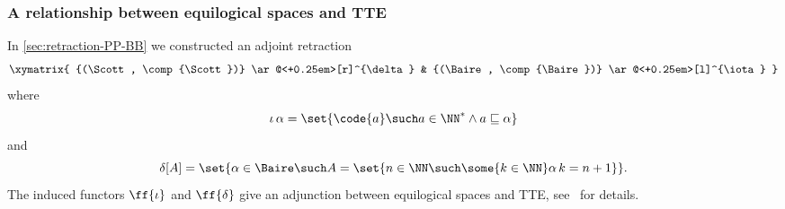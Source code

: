 \subsubsection{A relationship between equilogical spaces and TTE}
\label{sec:equ-tte}

In \cref{sec:retraction-PP-BB} we constructed an adjoint retraction
%
\begin{equation*}
  \xymatrix{
    {(\Scott, \comp{\Scott})}
    \ar@<+0.25em>[r]^{\delta}
    &
    {(\Baire, \comp{\Baire})}
    \ar@<+0.25em>[l]^{\iota}
  }
\end{equation*}
%
where
%
\begin{equation*}
  \iota \, \alpha =
  \set{ \code{a} \such
    a \in \NN^{*} \land a \sqsubseteq \alpha
    }
\end{equation*}
%
and
%
\begin{equation*}
  \delta[A] =
  \set{ \alpha \in \Baire \such
        A = \set{n \in \NN \such \some{k \in \NN} \alpha\,k = n + 1}
  }.
\end{equation*}
%
The induced functors $\ff{\iota}$ and $\ff{\delta}$ give an adjunction between equilogical spaces and TTE, see~ for details.



